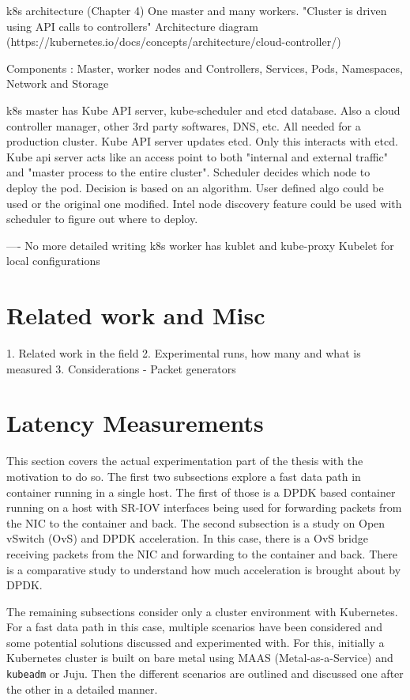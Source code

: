 \documentclass[english, 12pt, a4paper, elec, utf8, a-1b, online]{aaltothesis}
\begin{document}
k8s architecture (Chapter 4)
One master and many workers. "Cluster is driven using API calls to controllers" Architecture diagram (https://kubernetes.io/docs/concepts/architecture/cloud-controller/)

Components : Master, worker nodes and Controllers, Services, Pods, Namespaces, Network and Storage

k8s master has Kube API server, kube-scheduler and etcd database.
Also a cloud controller manager, other 3rd party softwares, DNS, etc. All needed for a production cluster. Kube API server updates etcd. Only this interacts with etcd.
Kube api server acts like an access point to both "internal and external traffic" and "master process to the entire cluster".
Scheduler decides which node to deploy the pod. Decision is  based on an algorithm. User defined algo could be used or the original one modified. Intel node discovery feature could be used with scheduler to figure out where to deploy.

---- No more detailed writing
k8s worker has kublet and kube-proxy
Kubelet for local configurations

\clearpage
\section{Related work and Misc}
1. Related work in the field
2. Experimental runs, how many and what is measured
3. Considerations - Packet generators


\clearpage
\section{Latency Measurements}
This section covers the actual experimentation part of the thesis with the motivation to do so. The first two subsections explore a fast data path in container running in a single host. The first of those is a DPDK based container running on a host with SR-IOV interfaces being used for forwarding packets from the NIC to the container and back. The second subsection is a study on Open vSwitch (OvS) and DPDK acceleration. In this case, there is a OvS bridge receiving packets from the NIC and forwarding to the container and back. There is a comparative study to understand how much acceleration is brought about by DPDK.

The remaining subsections consider only a cluster environment with Kubernetes. For a fast data path in this case, multiple scenarios have been considered and some potential solutions discussed and experimented with. For this, initially a Kubernetes cluster is built on bare metal using MAAS (Metal-as-a-Service) and \lstinline{kubeadm} or Juju. Then the different scenarios are outlined and discussed one after the other in a detailed manner.
\end{document}
